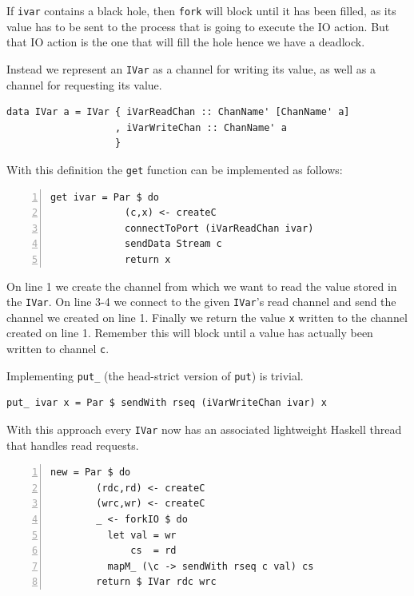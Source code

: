 \documentclass[a4paper, oneside, final]{memoir}
\begin{document}
If \texttt{ivar} contains a black hole, then \texttt{fork} will block
until it has been filled, as its value has to be sent to the process
that is going to execute the IO action.  But that IO action is the one
that will fill the hole hence we have a deadlock.

Instead we represent an \texttt{IVar} as a channel for writing its
value, as well as a channel for requesting its value. \newline

\begin{lstlisting}
data IVar a = IVar { iVarReadChan :: ChanName' [ChanName' a]
                   , iVarWriteChan :: ChanName' a
                   }
\end{lstlisting}

With this definition the \texttt{get} function can be implemented as 
follows: \newline

\begin{lstlisting}[numbers=left, numberstyle=\tiny]
get ivar = Par $ do
             (c,x) <- createC
             connectToPort (iVarReadChan ivar)
             sendData Stream c
             return x
\end{lstlisting}

On line 1 we create the channel from which we want to read the value
stored in the \texttt{IVar}. On line 3-4 we connect to the given
\texttt{IVar}'s read channel and send the channel we created on line 1. 
Finally we return the value \texttt{x} written to the channel created on line 1. Remember this will block until a value has actually been written to 
channel \texttt{c}.

Implementing \texttt{put\_} (the head-strict version of \texttt{put})
is trivial. \newline

\begin{lstlisting}
put_ ivar x = Par $ sendWith rseq (iVarWriteChan ivar) x
\end{lstlisting}

With this approach every \texttt{IVar} now has an associated lightweight
Haskell thread that handles read requests. \newline

\begin{lstlisting}[numbers=left, numberstyle=\tiny]
new = Par $ do
        (rdc,rd) <- createC
        (wrc,wr) <- createC
        _ <- forkIO $ do
          let val = wr
              cs  = rd
          mapM_ (\c -> sendWith rseq c val) cs
        return $ IVar rdc wrc
\end{lstlisting}
\end{document}
